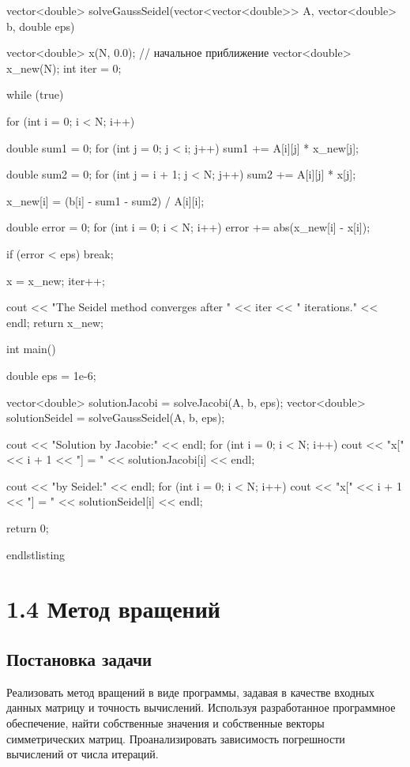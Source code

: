 vector<double> solveGaussSeidel(vector<vector<double>> A, vector<double> b, double eps) {
    vector<double> x(N, 0.0); // начальное приближение
    vector<double> x_new(N);
    int iter = 0;

    while (true) {
        for (int i = 0; i < N; i++) {
            double sum1 = 0;
            for (int j = 0; j < i; j++) {
                sum1 += A[i][j] * x_new[j];
            }

            double sum2 = 0;
            for (int j = i + 1; j < N; j++) {
                sum2 += A[i][j] * x[j];
            }

            x_new[i] = (b[i] - sum1 - sum2) / A[i][i];
        }

        double error = 0;
        for (int i = 0; i < N; i++) {
            error += abs(x_new[i] - x[i]);
        }

        if (error < eps) {
            break;
        }

        x = x_new;
        iter++;
    }

    cout << "The Seidel method converges after " << iter << " iterations." << endl;
    return x_new;
}

int main() {
    double eps = 1e-6;

    vector<double> solutionJacobi = solveJacobi(A, b, eps);
    vector<double> solutionSeidel = solveGaussSeidel(A, b, eps);

    cout << "Solution by Jacobie:" << endl;
    for (int i = 0; i < N; i++) {
        cout << "x[" << i + 1 << "] = " << solutionJacobi[i] << endl;
    }

    cout << "\nSolution by Seidel:" << endl;
    for (int i = 0; i < N; i++) {
        cout << "x[" << i + 1 << "] = " << solutionSeidel[i] << endl;
    }

    return 0;
}
end{lstlisting}
\section* {1.4  Метод вращений}

\subsection{Постановка задачи}
Реализовать метод вращений в виде программы, задавая в качестве входных данных матрицу и точность вычислений. Используя разработанное программное обеспечение, найти собственные значения и собственные векторы симметрических матриц. Проанализировать зависимость погрешности вычислений от числа итераций. 

